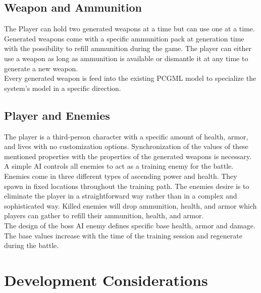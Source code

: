 \documentclass[MGS,Master,english]{twbook}%
\begin{document}
\subsection{Weapon and Ammunition}
The Player can hold two generated weapons at a time but can use one at a time. Generated weapons come with a specific ammunition pack at generation time with the possibility to refill ammunition during the game. The player can either use a weapon as long as ammunition is available or dismantle it at any time to generate a new weapon.\\
Every generated weapon is feed into the existing PCGML model to specialize the system’s model in a specific direction.

\subsection{Player and Enemies}
The player is a third-person character with a specific amount of health, armor, and lives with no customization options. Synchronization of the values of these mentioned properties with the properties of the generated weapons is necessary.\\
A simple AI controls all enemies to act as a training enemy for the battle. Enemies come in three different types of ascending power and health. They spawn in fixed locations throughout the training path. The enemies desire is to eliminate the player in a straightforward way rather than in a complex and sophisticated way. Killed enemies will drop ammunition, health, and armor which players can gather to refill their ammunition, health, and armor.\\
The design of the boss AI enemy defines specific base health, armor and damage. The base values increase with the time of the training session and regenerate during the battle.

\section{Development Considerations}
\end{document}
